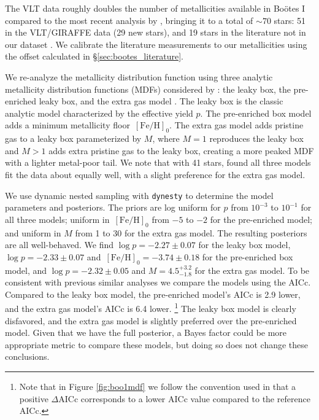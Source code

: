 \documentclass[twocolumn]{aastex63}
\newcommand{\unit}[1]{\ensuremath{\mathrm{\,#1}}\xspace}
\newcommand{\feh}{\unit{[Fe/H]}}
\newcommand{\code}[1]{\texttt{#1}\xspace}
\newcommand{\revise}[1]{#1}
\begin{document}
The VLT data roughly doubles the number of metallicities available in Bo{\"o}tes I compared to the most recent analysis by \citet{lai2011}, bringing it to a total of ${\sim}70$ stars: 51 in the VLT/GIRAFFE data (29 new stars), and 19 stars in the literature not in our dataset \citep{nor2010, lai2011}. We calibrate the literature measurements to our metallicities using the offset calculated in \S\ref{sec:bootes_literature}. 

We re-analyze the metallicity distribution function using three analytic metallicity distribution functions (MDFs) considered by \citet{lai2011}: the leaky box, the pre-enriched leaky box, and the extra gas model \citep{kir2011}.
The leaky box is the classic analytic model characterized by the effective yield $p$.
The pre-enriched box model adds a minimum metallicity floor $\feh_0$.
The extra gas model \citep{lyndenbell75} adds pristine gas to a leaky box parameterized by $M$, where $M=1$ reproduces the leaky box and $M > 1$ adds extra pristine gas to the leaky box, creating a more peaked MDF with a lighter metal-poor tail.
 We note that with 41 stars, \citet{lai2011} found all three models fit the data about equally well, with a slight preference for the extra gas model.

We use dynamic nested sampling with \code{dynesty} \citep{dynesty} to determine the model parameters and posteriors.
The priors are log uniform for $p$ from $10^{-3}$ to $10^{-1}$ for all three models; uniform in $\feh_0$ from $-5$ to $-2$ for the pre-enriched model; and uniform in $M$ from 1 to 30 for the extra gas model.
The resulting posteriors are all well-behaved.
We find $\log p= -2.27 \pm 0.07$ for the leaky box model, $\log p = -2.33 \pm 0.07$ and $\feh_0 = -3.74 \pm 0.18$ for the pre-enriched box model, and $\log p = -2.32 \pm 0.05$ and $M = 4.5^{+3.2}_{-1.8}$ for the extra gas model.
To be consistent with previous similar analyses \citep{lai2011, kir2013, kir2020} we compare the models using the AICc.
Compared to the leaky box model, the pre-enriched model's AICc is 2.9 lower, and the extra gas model's AICc is 6.4 lower. \footnote{\revise{Note that in Figure \ref{fig:boo1mdf} we follow the convention used in \citet{kir2013} that a positive $\Delta$AICc corresponds to a lower AICc value compared to the reference AICc.}} The leaky box model is clearly disfavored, and the extra gas model is slightly preferred over the pre-enriched model.
Given that we have the full posterior, a Bayes factor could be more appropriate metric to compare these models, but doing so does not change these conclusions.
\end{document}
